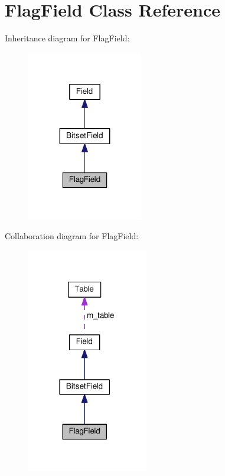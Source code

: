 \hypertarget{classFlagField}{}\section{Flag\+Field Class Reference}
\label{classFlagField}


Inheritance diagram for Flag\+Field\+:
\nopagebreak
\begin{figure}[H]
\begin{center}
\leavevmode
\includegraphics[width=143pt]{classFlagField__inherit__graph}
\end{center}
\end{figure}


Collaboration diagram for Flag\+Field\+:
\nopagebreak
\begin{figure}[H]
\begin{center}
\leavevmode
\includegraphics[width=150pt]{classFlagField__coll__graph}
\end{center}
\end{figure}
